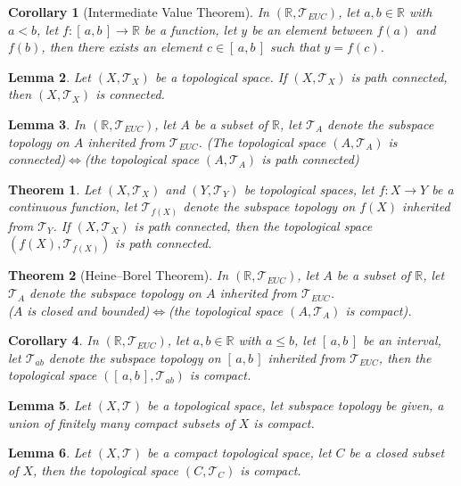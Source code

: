 \documentclass[11pt]{article}
\theoremstyle{break}
\theoremstyle{break}
\newtheorem{thm}{Theorem}[section]
\newtheorem{lem}{Lemma}[thm]
\newtheorem{corT}[lem]{Corollary}
\newcommand{\R}{\mathbb{R}}
\newcommand{\T}{\mathcal{T}}
\newcommand{\Intab}{[\,a,b\,]}
\begin{document}
	\begin{corT}[Intermediate Value Theorem]
		In $(\R,\T_{EUC})$, let $a,b \in \R$ with $a<b$, let $f:[\,a,b\,] \to \R$ be a function, let $y$ be an element between $f(a)$ and $f(b)$, then there exists an element $c \in [\,a,b\,]$ such that $y=f(c)$.
	\end{corT}
	
	\begin{lem}
		Let $(X,\T_X)$ be a topological space. If $(X,\T_X)$ is path connected, then $(X,\T_X)$ is connected.
	\end{lem}
	
	\begin{lem}
		In $(\R,\T_{EUC})$, let $A$ be a subset of $\R$, let $\T_A$ denote the subspace topology on $A$ inherited from $\T_{EUC}$. (The topological space $(A,\T_A)$ is connected)$\iff$(the topological space $(A,\T_A)$ is path connected)
	\end{lem}
	
	\begin{thm}
		Let $(X,\T_X)$ and $(Y,\T_Y)$ be topological spaces, let $f:X \to Y$ be a continuous function, let $\T_{f(X)}$ denote the subspace topology on $f(X)$ inherited from $\T_Y$. If $(X,\T_X)$ is path connected, then the topological space $(f(X),\T_{f(X)})$ is path connected.
	\end{thm}
	
	\begin{thm}[Heine–Borel Theorem]
		In $(\R,\T_{EUC})$, let $A$ be a subset of $\R$, let $\T_A$ denote the subspace topology on $A$ inherited from $\T_{EUC}$.\\ ($A$ is closed and bounded)$\iff$(the topological space $(A,\T_A)$ is compact).
	\end{thm}
	
	\begin{corT}
		In $(\R,\T_{EUC})$, let $a,b \in \R$ with $a \leq b$, let $[\, a,b \, ]$ be an interval, let $\T_{ab}$ denote the subspace topology on $\Intab$ inherited from $\T_{EUC}$, then the topological space $(\Intab, \T_{ab})$ is compact.
	\end{corT}
	
	\begin{lem}
		Let $(X,\T)$ be a topological space, let subspace topology be given, a union of finitely many compact subsets of $X$ is compact.
	\end{lem}	
	
	\begin{lem}
	Let $(X,\T)$ be a compact topological space, let $C$ be a closed subset of $X$, then the topological space $(C,\T_C)$ is compact.
	\end{lem}	
	
\end{document}
